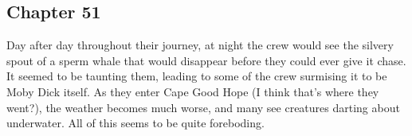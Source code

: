 \subsection{Chapter 51}

Day after day throughout their journey, at night the crew would see the silvery
spout of a sperm whale that would disappear before they could ever give it
chase. It seemed to be taunting them, leading to some of the crew surmising it
to be Moby Dick itself. As they enter Cape Good Hope (I think that's where they
went?), the weather becomes much worse, and many see creatures darting about
underwater. All of this seems to be quite foreboding.
